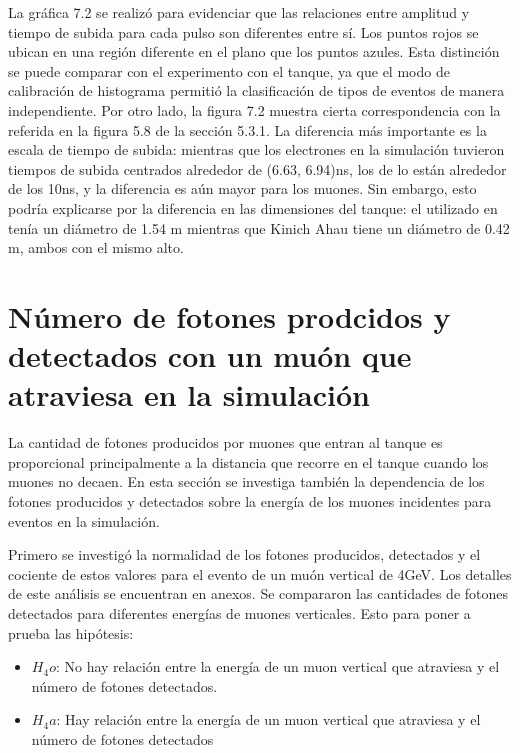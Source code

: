 \documentclass{book}
\begin{document}
La gr\'afica 7.2 se realiz\'o para evidenciar que las relaciones entre amplitud y tiempo de subida para cada pulso son diferentes entre s\'i. Los puntos rojos se ubican en una regi\'on diferente en el plano que los puntos azules. Esta distinci\'on se puede comparar con el experimento con el tanque, ya que el modo de calibraci\'on de histograma permiti\'o la clasificaci\'on de tipos de eventos de manera independiente. Por otro lado, la figura 7.2 muestra cierta correspondencia con la referida en la figura 5.8 de la secci\'on 5.3.1. La diferencia m\'as importante es la escala de tiempo de subida: mientras que los electrones en la simulaci\'on tuvieron tiempos de subida centrados alrededor de (6.63, 6.94)ns, los de \citep{Salazar} lo est\'an alrededor de los 10ns, y la diferencia es a\'un mayor para los muones. Sin embargo, esto podr\'ia explicarse por la diferencia en las dimensiones del tanque: el utilizado en \citep{Salazar} ten\'ia un di\'ametro de 1.54 m mientras que Kinich Ahau tiene un di\'ametro de 0.42 m, ambos con el mismo alto.

\section{N\'umero de fotones prodcidos y detectados con un mu\'on que atraviesa en la simulaci\'on}

La cantidad de fotones producidos por muones que entran al tanque es proporcional principalmente a la distancia que recorre en el tanque cuando los  muones no decaen. En esta secci\'on se investiga tambi\'en la dependencia de los fotones producidos y detectados sobre la energ\'ia de los muones incidentes para eventos en la simulaci\'on.

Primero se investig\'o la normalidad de los fotones producidos, detectados y el cociente de estos valores para el evento de un mu\'on vertical de 4GeV. Los detalles de este an\'alisis se encuentran en anexos. Se compararon las cantidades de fotones detectados para diferentes energ\'ias de muones verticales. Esto para poner a prueba las hip\'otesis:

\begin{itemize}
\item $H_4o$: No hay relaci\'on entre la energ\'ia de un muon vertical que atraviesa y el n\'umero de fotones detectados.
\item $H_4a$: Hay relaci\'on entre la energ\'ia de un muon vertical que atraviesa y el n\'umero de fotones detectados
\end{itemize}
\end{document}
